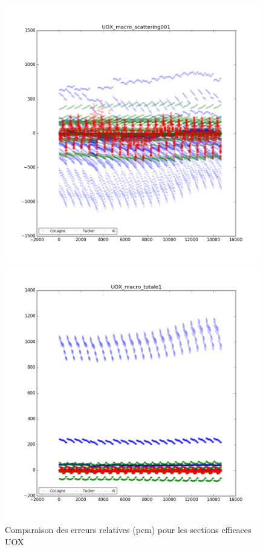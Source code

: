 \begin{center}
\begin{figure}[h]
\begin{minipage}[b]{0.5\linewidth}
   \end{minipage}
	 \begin{minipage}[b]{0.5\linewidth}
			\centering \includegraphics[scale=0.3]{images/UOX/UOX_macro_scattering001.png}
	 \end{minipage}
	 \begin{minipage}[b]{0.5\linewidth}
			\centering \includegraphics[scale=0.3]{images/UOX/UOX_macro_totale1.png}
	 \end{minipage}
	 \caption{Comparaison des erreurs relatives (pcm) pour les sections efficaces UOX}
\end{figure}


\end{center}
